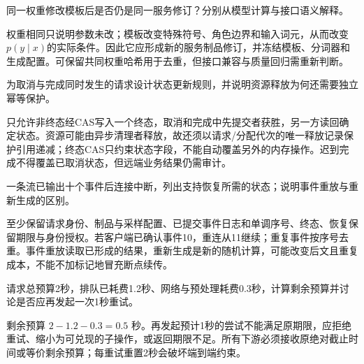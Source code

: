 
\begin{exercises}
\begin{exercise} 同一权重修改模板后是否仍是同一服务修订？分别从模型计算与接口语义解释。

\begin{solution}
权重相同只说明参数未改；模板改变特殊符号、角色边界和输入词元，从而改变$p(y\mid x)$的实际条件。因此它应形成新的服务制品修订，并冻结模板、分词器和生成配置。可保留共同权重哈希用于去重，但接口兼容与质量回归需重新判断。
\end{solution}
\end{exercise}

\begin{exercise} 为取消与完成同时发生的请求设计状态更新规则，并说明资源释放为何还需要独立幂等保护。

\begin{solution}
只允许非终态经CAS写入一个终态，取消和完成中先提交者获胜，另一方读回确定状态。资源可能由异步清理者释放，故还须以请求/分配代次的唯一释放记录保护引用递减；终态CAS只约束状态字段，不能自动覆盖另外的内存操作。迟到完成不得覆盖已取消状态，但远端业务结果仍需审计。
\end{solution}
\end{exercise}

\begin{exercise} 一条流已输出十个事件后连接中断，列出支持恢复所需的状态；说明事件重放与重新生成的区别。

\begin{solution}
至少保留请求身份、制品与采样配置、已提交事件日志和单调序号、终态、恢复保留期限与身份授权。若客户端已确认事件10，重连从11继续；重复事件按序号去重。事件重放读取已形成的结果，重新生成是新的随机计算，可能改变后文且重复成本，不能不加标记地冒充断点续传。
\end{solution}
\end{exercise}

\begin{exercise} 请求总预算2秒，排队已耗费1.2秒、网络与预处理耗费0.3秒，计算剩余预算并讨论是否应再发起一次1秒重试。

\begin{solution}
剩余预算 $2-1.2-0.3=0.5$ 秒。再发起预计1秒的尝试不能满足原期限，应拒绝重试、缩小为可兑现的子操作，或返回期限不足。所有下游必须接收原绝对截止时间或等价剩余预算；每重试重置2秒会破坏端到端约束。
\end{solution}
\end{exercise}


\end{exercises}
